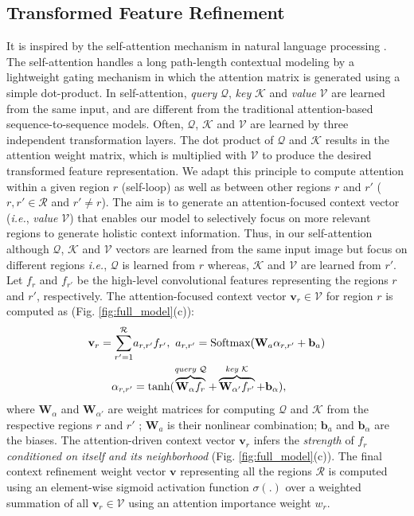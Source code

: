 \documentclass[journal]{IEEEtran}
\begin{document}
\subsection{Transformed Feature Refinement}\label{sec:cotext}
It is inspired by the self-attention mechanism in natural language processing \cite{vaswani2017attention}. The self-attention handles a long path-length contextual modeling by a lightweight gating mechanism in which the attention matrix is generated using a simple dot-product. In self-attention, \textit{query} $\mathcal{Q}$, \textit{key} $\mathcal{K}$ and \textit{value} $\mathcal{V}$ are learned from the same input, and are different from the traditional attention-based sequence-to-sequence models. Often, $\mathcal{Q}$, $\mathcal{K}$ and $\mathcal{V}$ are learned by three independent transformation layers. The dot product of $\mathcal{Q}$ and $\mathcal{K}$ results in the attention weight matrix, which is multiplied with $\mathcal{V}$ to produce the desired transformed feature representation. We adapt this principle to compute attention within a given region $r$ (self-loop) as well as between other regions $r$ and $r'$ ($r,r' \in \mathcal{R}$ and $r'\ne r$). The aim is to generate an attention-focused context vector (\textit{i.e.}, \textit{value} $\mathcal{V}$) that enables our model to selectively focus on more relevant regions to generate holistic context information. Thus, in our self-attention although $\mathcal{Q}$, $\mathcal{K}$ and $\mathcal{V}$ vectors are learned from the same input image but focus on different regions \textit{i.e.}, $\mathcal{Q}$ is learned from $r$ whereas, $\mathcal{K}$ and $\mathcal{V}$ are learned from $r'$. Let $f_r$ and $f_{r'}$ be the high-level convolutional features representing the regions $r$ and $r'$, respectively. The attention-focused context vector $\mathbf{v}_r \in \mathcal{V}$ for region $r$ is computed as (Fig. \ref{fig:full_model}(c)):\vspace{-.07cm}
\begin{equation}
\begin{split}
    \mathbf{v}_r = \sum_{r'=1}^{\mathcal{R}}&a_{r,r'}f_{r'},\text{ } a_{r,r'}=\text{Softmax}(\mathbf{W}_{a}\alpha_{r,r'}+\mathbf{b}_a)\\
    \alpha_{r,r'} &= \text{tanh}(\overbrace{\mathbf{W}_\alpha f_r}^\textrm{\textit{query} $\mathcal{Q}$} + \overbrace{\mathbf{W}_{\alpha'}f_{r'}}^\textrm{\textit{key}  $\mathcal{K}$}+\mathbf{b}_{\alpha}),
\end{split}
\end{equation}
where $\mathbf{W}_{\alpha}$ and $\mathbf{W}_{\alpha'}$ are weight matrices for computing $\mathcal{Q}$ and $\mathcal{K}$ from the respective regions $r$ and $r'$ ;  $\mathbf{W}_{a}$ is their nonlinear combination; $\mathbf{b}_a$ and $\mathbf{b}_\alpha$ are the biases. The attention-driven context vector $\mathbf{v}_r$ infers the \textit{strength} of $f_r$ \textit{conditioned on itself and its neighborhood} (Fig. \ref{fig:full_model}(c)). The final context refinement weight vector $\mathbf{v}$ representing all the regions $\mathcal{R}$ is computed using an element-wise sigmoid activation function $\sigma(.)$ over a weighted summation of all $\mathbf{v}_r\in \mathcal{V}$ using an attention importance weight $w_r$. 
\end{document}
